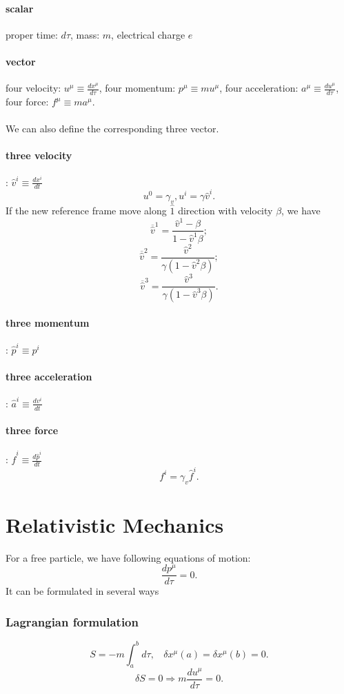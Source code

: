 \paragraph{scalar} proper time: $d \tau$, mass: $m$, electrical charge $e$
\paragraph{vector} four velocity: $u^{\mu} \equiv \frac{dx^{\mu}}{d \tau}$, four momentum: $p^{\mu} \equiv m u^{\mu}$, four acceleration: $a^{\mu} \equiv \frac{du^{\mu}}{d \tau}$, four force: $f^{\mu} \equiv m a^{\mu}$.\\ \\
We can also define the corresponding three vector.
\paragraph{three velocity}: $\hat{v}^{i} \equiv \frac{dx^i}{dt}$
\[u^0 = \gamma_v, u^i = \gamma \hat{v}^i.\]
If the new reference frame move along $\hat{1}$ direction with velocity $\beta$, we have
\[\overline{\hat{v}}^1 = \frac{\hat{v}^1 - \beta}{1-\hat{v}^1 \beta};\]
\[\overline{\hat{v}}^2 = \frac{\hat{v}^2}{\gamma(1-\hat{v}^2 \beta)};\]
\[\overline{\hat{v}}^3 = \frac{\hat{v}^3}{\gamma(1-\hat{v}^3 \beta)}.\]
\paragraph{three momentum}: $\hat{p}^{i} \equiv p^i$
\paragraph{three acceleration}: $\hat{a}^{i} \equiv \frac{dv^i}{dt}$
\paragraph{three force}: $\hat{f}^i \equiv \frac{d\hat{p}^i}{dt}$
\[f^i = \gamma_v \hat{f}^i.\]

\section{Relativistic Mechanics}
For a free particle, we have following equations of motion:
\[\frac{dp^{\mu}}{d\tau} = 0.\]
It can be formulated in several ways
\subsubsection{Lagrangian formulation}
\[S=-m\int_{a}^{b} d\tau, \ \ \ \ \delta x^{\mu}(a) = \delta x^{\mu}(b) = 0.\]
\[\delta S = 0 \Rightarrow m\frac{du^{\mu}}{d\tau} = 0.\]

